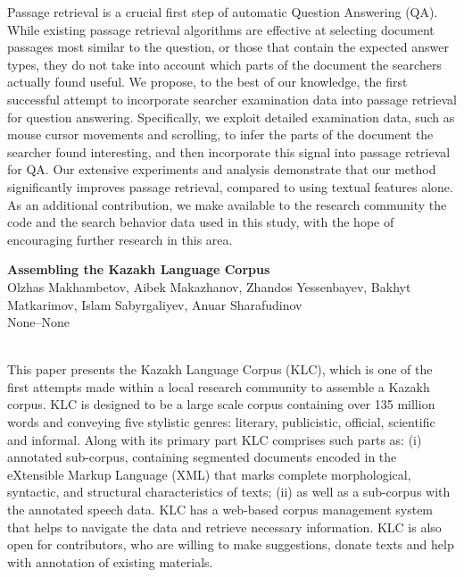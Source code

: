 \documentclass[twoside,makeidx]{book}
\begin{document}
{\small Passage retrieval is a crucial first step of automatic Question Answering (QA). While existing passage retrieval algorithms are effective at selecting document passages most similar to the question, or those that contain the expected answer types, they do not take into account which parts of the document the searchers actually found useful. We propose, to the best of our knowledge, the first successful attempt to incorporate searcher examination data into passage retrieval for question answering. Specifically, we exploit detailed examination data, such as mouse cursor movements and scrolling, to infer the parts of the document the searcher found interesting, and then incorporate this signal into passage retrieval for QA. Our extensive experiments and analysis demonstrate that our method significantly improves passage retrieval, compared to using textual features alone. As an additional contribution, we make available to the research community the code and the search behavior data used in this study, with the hope of encouraging further research in this area.}
\par\vspace{2em}\noindent%
\begin{minipage}{\linewidth}%
\begin{center}
\textbf{\normalsize Assembling the Kazakh Language Corpus}\\
\normalsize  Olzhas Makhambetov,  Aibek Makazhanov,  Zhandos Yessenbayev,  Bakhyt Matkarimov,  Islam Sabyrgaliyev,  Anuar Sharafudinov\\
{\small None--None}\\
\end{center}
\end{minipage}\\[0.5em]
\nopagebreak%
\noindent%
{\small This paper presents the Kazakh Language Corpus (KLC), which is one of the first attempts made within a local research community to assemble a Kazakh corpus. KLC is designed to be a large scale corpus containing over 135 million words and conveying five stylistic genres: literary, publicistic, official, scientific and informal. Along with its primary part KLC comprises such parts as: (i) annotated sub-corpus, containing segmented documents encoded in the eXtensible Markup Language (XML) that marks complete morphological, syntactic, and structural characteristics of texts; (ii) as well as a sub-corpus with the annotated speech data. KLC has a web-based corpus management system that helps to navigate the data and retrieve necessary information. KLC is also open for contributors, who are willing to make suggestions, donate texts and help with annotation of existing materials.}
\end{document}

